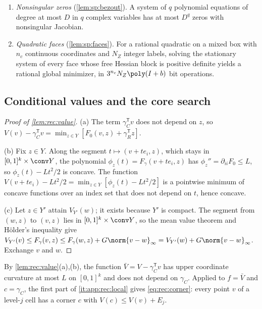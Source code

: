 \begin{enumerate}[label=(T\arabic*),leftmargin=*]
a rational $y\in P$ and rationals $a\le\min_Pf\le f(y)\le U\le a+\eta$ in
time polynomial in the length of the data and $\log(1/\eta)$; here the
oracle of that lemma is exact rational evaluation of $f$ and $\nabla f$, and
the repair map is coordinatewise clipping to $P$, which is nonexpansive. If
$\nabla^2f\succeq gI$ on $P$ with rational $g>0$, the unique minimizer $y^*$
satisfies $\norm{y-y^*}\le\sqrt{2\eta/g}$.
\item\label{it:app:rec:bezout} \emph{Nonsingular zeros} (\cref{lem:sp:bezout}).
A system of $q$ polynomial equations of degree at most $D$ in $q$ complex
variables has at most $D^q$ zeros with nonsingular Jacobian.
\item\label{it:app:rec:faces} \emph{Quadratic faces} (\cref{lem:sp:faces}).
For a rational quadratic on a mixed box with $n_c$ continuous coordinates
and $N_Z$ integer labels, solving the stationary system of every face whose
free Hessian block is positive definite yields a rational global minimizer,
in $3^{n_c}N_Z\poly(I+b)$ bit operations.
\end{enumerate}

\subsection{Conditional values and the core search}\label{app:rec:search}

\begin{proof}[Proof of \cref{lem:rec:value}]
(a) The term $\gamma_C^{\mathsf T}v$ does not depend on $z$, so
$V(v)-\gamma_C^{\mathsf T}v=\min_{z\in Y}[F_0(v,z)+\gamma_R^{\mathsf T}z]$.

(b) Fix $z\in Y$. Along the segment $t\mapsto(v+te_i,z)$, which stays in
$[0,1]^k\times\conv Y$, the polynomial $\phi_z(t)=F_\gamma(v+te_i,z)$ has
$\phi_z''=\partial_{ii}F_0\le L$, so $\phi_z(t)-Lt^2/2$ is concave. The
function $V(v+te_i)-Lt^2/2=\min_{z\in Y}[\phi_z(t)-Lt^2/2]$ is a pointwise
minimum of concave functions over an index set that does not depend on $t$,
hence concave.

(c) Let $z\in Y'$ attain $V_{Y'}(w)$; it exists because $Y'$ is compact. The
segment from $(w,z)$ to $(v,z)$ lies in $[0,1]^k\times\conv Y$, so the mean
value theorem and H\"older's inequality give
$V_{Y'}(v)\le F_\gamma(v,z)\le F_\gamma(w,z)+G\norm{v-w}_\infty
=V_{Y'}(w)+G\norm{v-w}_\infty$. Exchange $v$ and $w$.
\end{proof}

By \cref{lem:rec:value}(a),(b), the function $\bar V=V-\gamma_C^{\mathsf T}v$
has upper coordinate curvature at most $L$ on $[0,1]^k$ and does not depend
on $\gamma_C$. Applied to $f=\bar V$ and $c=\gamma_C$, the first part of
\ref{it:app:rec:local} gives \eqref{eq:rec:corner}: every point $v$ of a
level-$j$ cell has a corner $c$ with $V(c)\le V(v)+E_j$.

